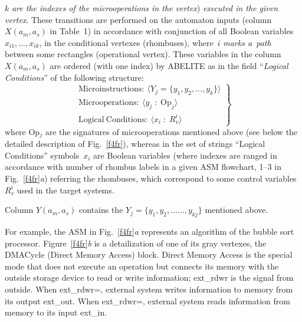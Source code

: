 \begin{multicols}{2}
\bigskip
\addtocounter{table}{1}

\noindent
 $k$ \textit{are the indexes of the microoperations in the vertex}) 
\textit{executed in the given vertex}. These transitions are performed on the automaton inputs 
(column~$X(a_m,a_s)$ in Table~1) in accordance with conjunction of all Boolean 
variables $x_{i1}, \ldots , x_{ik}$, in the conditional vertexes (rhombuses), where~$i$ \textit{marks 
a~path} between some rectangles (operational vertex). These variables in the 
column~$X(a_m,a_s)$ are ordered (with one index) by ABELITE as in the field 
``\textit{Logical Conditions}'' of the following structure:   
          \begin{equation}
          \left.
          \begin{array}{l}
 \mathrm{Microinstructions}:\ \langle Y_j =\{y_1, y_2,\ldots ,y_k\}\rangle\\[6pt]
 \mathrm{Microoperations}:\ \langle y_j\;:\;\mathrm{Op}_j\rangle \\[6pt]
 \mathrm{Logical\ Conditions}:\ \langle x_i\;:\;R_v^i\rangle
\end{array}
\right \}
\label{e3fr}
\end{equation}
where Op$_j$ are the signatures of microoperations mentioned above (see below the detailed 
description of Fig.~\ref{f4fr}), whereas in the set of strings ``Logical Conditions'' 
symbols~$x_i$ are Boolean variables (where indexes are ranged in accordance with number of 
rhombus labels in a given ASM flowchart, 1--3 in Fig.~\ref{f4fr}\textit{a}) referring the 
rhombuses, which correspond to some control variables~$R_v^i$ used in the target systems. 
            

Column $Y(a_m,a_s)$ contains the $Y_j =\{y_1,y_2,\ldots$\linebreak $\ldots ,y_{kj}\}$ mentioned above.



For example, the ASM in Fig.~\ref{f4fr}\textit{a} represents an algorithm of the bubble sort 
processor. Figure~\ref{f4fr}\textit{b} is
a detailization of one of its gray vertexes, the DMACycle 
(Direct Memory Access) block. Direct Memory Access is the special mode that does not execute an operation but 
connects its memory with the outside storage device to read or write information; ext\_rdwr is 
the signal from outside. When ext\_rdwr\;=, external system writes information to memory 
from its output ext\_out. When ext\_rdwr\;=, external system reads information from 
memory to its input ext\_in. 
       

\end{multicols}
